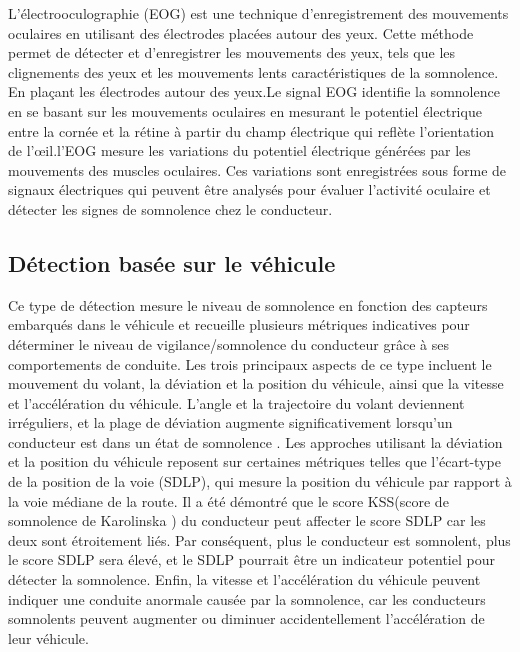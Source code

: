 L’électrooculographie (EOG) est une technique d’enregistrement des mouvements oculaires en utilisant des électrodes placées autour des yeux. Cette méthode permet de détecter et d’enregistrer les mouvements des yeux, tels que les clignements des yeux et les mouvements lents caractéristiques de la somnolence. En plaçant les électrodes autour des yeux.Le signal EOG identifie la somnolence en se basant sur les mouvements oculaires en mesurant le potentiel électrique entre la cornée et la rétine à partir du champ électrique qui reflète l'orientation de l'œil\cite{sahayadhas2012detecting}.l’EOG mesure les variations du potentiel électrique générées par les mouvements des muscles oculaires. Ces variations sont enregistrées sous forme de signaux électriques qui peuvent être analysés pour évaluer l’activité oculaire et détecter les signes de somnolence chez le conducteur.\\
 

\subsection{Détection  basée  sur le véhicule }
Ce type de détection mesure le niveau de somnolence en fonction des capteurs embarqués dans le véhicule et recueille plusieurs métriques indicatives pour déterminer le niveau de vigilance/somnolence du conducteur grâce à ses comportements de conduite\cite{doudou2020driver}. Les trois principaux aspects de ce type incluent le mouvement du volant, la déviation et la position du véhicule, ainsi que la vitesse et l'accélération du véhicule. L'angle et la trajectoire du volant deviennent irréguliers, et la plage de déviation augmente significativement lorsqu'un conducteur est dans un état de somnolence\cite{dong2010driver,zhong2007localized} . Les approches utilisant la déviation et la position du véhicule reposent sur certaines métriques telles que l'écart-type de la position de la voie (SDLP), qui mesure la position du véhicule par rapport à la voie médiane de la route. Il a été démontré que le score KSS(score de somnolence de Karolinska ) du conducteur peut affecter le score SDLP car les deux sont étroitement liés. Par conséquent, plus le conducteur est somnolent, plus le score SDLP sera élevé, et le SDLP pourrait être un indicateur potentiel pour détecter la somnolence\cite{dong2010driver,chen2015identification,ingre2006subjective}. Enfin, la vitesse et l'accélération du véhicule peuvent indiquer une conduite anormale causée par la somnolence, car les conducteurs somnolents peuvent augmenter ou diminuer accidentellement l'accélération de leur véhicule\cite{doudou2020driver}. 

